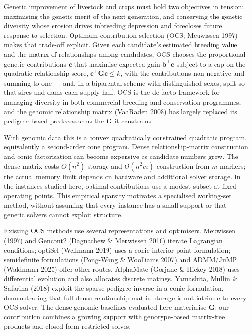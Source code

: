 \documentclass[11pt]{article}
\newcommand{\tp}{^{\top}}
\newcommand{\bc}{\mathbf{c}}
\newcommand{\bb}{\mathbf{b}}
\newcommand{\bG}{\mathbf{G}}
\begin{document}
Genetic improvement of livestock and crops must hold two objectives in tension: maximising the genetic merit of the next generation, and conserving the genetic diversity whose erosion drives inbreeding depression and forecloses future response to selection. Optimum contribution selection (OCS; Meuwissen 1997) makes that trade-off explicit. Given each candidate's estimated breeding value and the matrix of relationships among candidates, OCS chooses the proportional genetic contributions $\bc$ that maximise expected gain $\bb\tp\bc$ subject to a cap on the quadratic relationship score, $\bc\tp\bG\bc\le k$, with the contributions non-negative and summing to one --- and, in a biparental scheme with distinguished sexes, split so that sires and dams each supply half. OCS is the de facto framework for managing diversity in both commercial breeding and conservation programmes, and the genomic relationship matrix (VanRaden 2008) has largely replaced its pedigree-based predecessor as the $\bG$ it constrains.

With genomic data this is a convex quadratically constrained quadratic program, equivalently a second-order cone program. Dense relationship-matrix construction and conic factorisation can become expensive as candidate numbers grow. The dense matrix costs $O(n^2)$ storage and $O(n^2m)$ construction from $m$ markers; the actual memory limit depends on hardware and additional solver storage. In the instances studied here, optimal contributions use a modest subset at fixed operating points. This empirical sparsity motivates a specialised working-set method, without assuming that every instance has a small support or that generic solvers cannot exploit structure.

Existing OCS methods use several representations and optimisers. Meuwissen (1997) and Gencont2 (Dagnachew \& Meuwissen 2016) iterate Lagrangian conditions; optiSel (Wellmann 2019) uses a conic interior-point formulation; semidefinite formulations (Pong-Wong \& Woolliams 2007) and ADMM/JuMP (Waldmann 2025) offer other routes. AlphaMate (Gorjanc \& Hickey 2018) uses differential evolution and also allocates discrete matings. Yamashita, Mullin \& Safarina (2018) exploit the sparse pedigree inverse in a conic formulation, demonstrating that full dense relationship-matrix storage is not intrinsic to every OCS solver. The dense genomic baselines evaluated here materialise $\bG$; our contribution combines a growing support with genotype-based matrix-free products and closed-form restricted solves.
\end{document}
